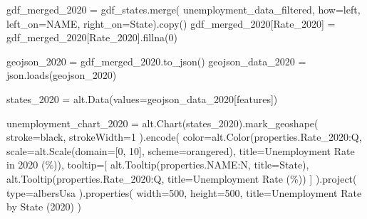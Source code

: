 \documentclass[
  letterpaper,
  DIV=11,
  numbers=noendperiod]{scrartcl}
\newenvironment{Shaded}{\begin{snugshade}}{\end{snugshade}}
\newcommand{\BuiltInTok}[1]{\textcolor[rgb]{0.00,0.23,0.31}{#1}}
\newcommand{\DecValTok}[1]{\textcolor[rgb]{0.68,0.00,0.00}{#1}}
\newcommand{\NormalTok}[1]{\textcolor[rgb]{0.00,0.23,0.31}{#1}}
\newcommand{\OperatorTok}[1]{\textcolor[rgb]{0.37,0.37,0.37}{#1}}
\newcommand{\StringTok}[1]{\textcolor[rgb]{0.13,0.47,0.30}{#1}}
\begin{document}
\begin{Shaded}
\begin{Highlighting}[]
\NormalTok{gdf\_merged\_2020 }\OperatorTok{=}\NormalTok{ gdf\_states.merge(}
\NormalTok{    unemployment\_data\_filtered, how}\OperatorTok{=}\StringTok{\textquotesingle{}left\textquotesingle{}}\NormalTok{, left\_on}\OperatorTok{=}\StringTok{\textquotesingle{}NAME\textquotesingle{}}\NormalTok{, right\_on}\OperatorTok{=}\StringTok{\textquotesingle{}State\textquotesingle{}}\NormalTok{).copy()}
\NormalTok{gdf\_merged\_2020[}\StringTok{\textquotesingle{}Rate\_2020\textquotesingle{}}\NormalTok{] }\OperatorTok{=}\NormalTok{ gdf\_merged\_2020[}\StringTok{\textquotesingle{}Rate\_2020\textquotesingle{}}\NormalTok{].fillna(}\DecValTok{0}\NormalTok{)}

\NormalTok{geojson\_2020 }\OperatorTok{=}\NormalTok{ gdf\_merged\_2020.to\_json()}
\NormalTok{geojson\_data\_2020 }\OperatorTok{=}\NormalTok{ json.loads(geojson\_2020)}

\NormalTok{states\_2020 }\OperatorTok{=}\NormalTok{ alt.Data(values}\OperatorTok{=}\NormalTok{geojson\_data\_2020[}\StringTok{\textquotesingle{}features\textquotesingle{}}\NormalTok{])}

\NormalTok{unemployment\_chart\_2020 }\OperatorTok{=}\NormalTok{ alt.Chart(states\_2020).mark\_geoshape(}
\NormalTok{    stroke}\OperatorTok{=}\StringTok{\textquotesingle{}black\textquotesingle{}}\NormalTok{,}
\NormalTok{    strokeWidth}\OperatorTok{=}\DecValTok{1}
\NormalTok{).encode(}
\NormalTok{    color}\OperatorTok{=}\NormalTok{alt.Color(}\StringTok{\textquotesingle{}properties.Rate\_2020:Q\textquotesingle{}}\NormalTok{,}
\NormalTok{                    scale}\OperatorTok{=}\NormalTok{alt.Scale(domain}\OperatorTok{=}\NormalTok{[}\DecValTok{0}\NormalTok{, }\DecValTok{10}\NormalTok{], scheme}\OperatorTok{=}\StringTok{\textquotesingle{}orangered\textquotesingle{}}\NormalTok{),}
\NormalTok{                    title}\OperatorTok{=}\StringTok{\textquotesingle{}Unemployment Rate in 2020 (\%)\textquotesingle{}}\NormalTok{),}
\NormalTok{    tooltip}\OperatorTok{=}\NormalTok{[}
\NormalTok{        alt.Tooltip(}\StringTok{\textquotesingle{}properties.NAME:N\textquotesingle{}}\NormalTok{, title}\OperatorTok{=}\StringTok{\textquotesingle{}State\textquotesingle{}}\NormalTok{),}
\NormalTok{        alt.Tooltip(}\StringTok{\textquotesingle{}properties.Rate\_2020:Q\textquotesingle{}}\NormalTok{, title}\OperatorTok{=}\StringTok{\textquotesingle{}Unemployment Rate (\%)\textquotesingle{}}\NormalTok{)}
\NormalTok{    ]}
\NormalTok{).project(}
    \BuiltInTok{type}\OperatorTok{=}\StringTok{\textquotesingle{}albersUsa\textquotesingle{}}
\NormalTok{).properties(}
\NormalTok{    width}\OperatorTok{=}\DecValTok{500}\NormalTok{,}
\NormalTok{    height}\OperatorTok{=}\DecValTok{500}\NormalTok{,}
\NormalTok{    title}\OperatorTok{=}\StringTok{\textquotesingle{}Unemployment Rate by State (2020)\textquotesingle{}}
\NormalTok{)}


\end{Highlighting}
\end{Shaded}
\end{document}
